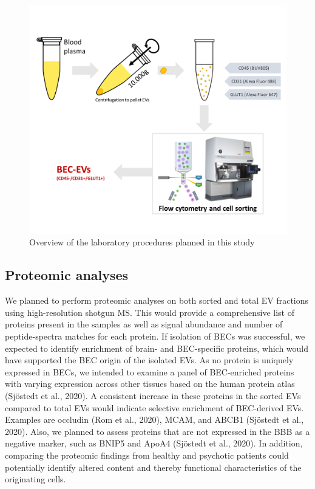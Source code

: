 \documentclass[authordate, empirical]{jote-new-article}
\begin{document}
	\begin{figure}
		\includegraphics[width=\linewidth]{media/image1.png}

		\caption{Overview of the laboratory procedures planned in this study}

		\label{fig:rId8}


	\end{figure}



	



	\emph{ }



	\subsection{Proteomic analyses}



	We planned to perform proteomic analyses on both sorted and total EV fractions using high-resolution shotgun MS. This would provide a comprehensive list of proteins present in the samples as well as signal abundance and number of peptide-spectra matches for each protein. If isolation of BECs was successful, we expected to identify enrichment of brain- and BEC-specific proteins, which would have supported the BEC origin of the isolated EVs. As no protein is uniquely expressed in BECs, we intended to examine a panel of BEC-enriched proteins with varying expression across other tissues based on the human protein atlas (Sjöstedt et al., 2020). A consistent increase in these proteins in the sorted EVs compared to total EVs would indicate selective enrichment of BEC-derived EVs. Examples are occludin (Rom et al., 2020), MCAM, and ABCB1 (Sjöstedt et al., 2020). Also, we planned to assess proteins that are not expressed in the BBB as a negative marker, such as BNIP5 and ApoA4 (Sjöstedt et al., 2020). In addition, comparing the proteomic findings from healthy and psychotic patients could potentially identify altered content and thereby functional characteristics of the originating cells.
\end{document}
